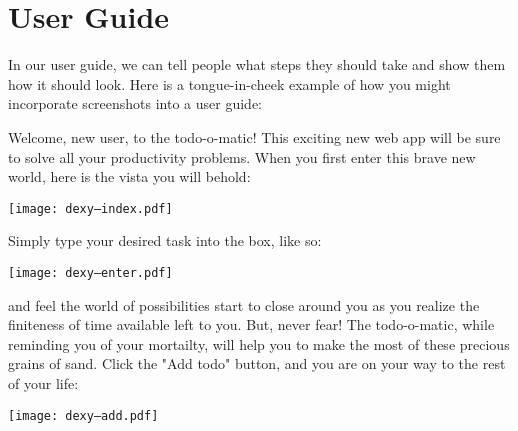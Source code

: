 \documentclass[a4paper]{tufte-handout}
\begin{document}
\section{User Guide}

In our user guide, we can tell people what steps they should take and show them how it should look. Here is a tongue-in-cheek example of how you might incorporate screenshots into a user guide:

\sffamily

Welcome, new user, to the todo-o-matic! This exciting new web app will be sure to solve all your productivity problems. When you first enter this brave new world, here is the vista you will behold:

\texttt{[image: dexy--index.pdf]}

Simply type your desired task into the box, like so:

\texttt{[image: dexy--enter.pdf]}

and feel the world of possibilities start to close around you as you realize the finiteness of time available left to you. But, never fear! The todo-o-matic, while reminding you of your mortailty, will help you to make the most of these precious grains of sand. Click the "Add todo" button, and you are on your way to the rest of your life:

\texttt{[image: dexy--add.pdf]}
\end{document}
